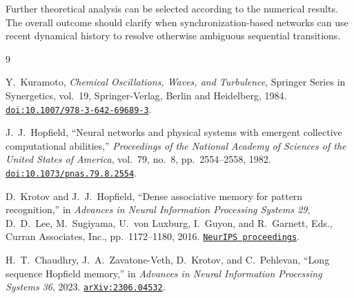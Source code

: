 \documentclass[11pt]{article}
\begin{document}
Further theoretical analysis can be selected according to the numerical results. The overall outcome should clarify when synchronization-based networks can use recent dynamical history to resolve otherwise ambiguous sequential transitions.

\begin{thebibliography}{9}

Y.~Kuramoto,
\textit{Chemical Oscillations, Waves, and Turbulence},
Springer Series in Synergetics, vol.~19,
Springer-Verlag, Berlin and Heidelberg, 1984.
\href{https://doi.org/10.1007/978-3-642-69689-3}
{\texttt{doi:10.1007/978-3-642-69689-3}}.

J.~J.~Hopfield,
``Neural networks and physical systems with emergent collective computational abilities,''
\textit{Proceedings of the National Academy of Sciences of the United States of America},
vol.~79, no.~8, pp.~2554--2558, 1982.
\href{https://doi.org/10.1073/pnas.79.8.2554}
{\texttt{doi:10.1073/pnas.79.8.2554}}.

D.~Krotov and J.~J.~Hopfield,
``Dense associative memory for pattern recognition,''
in \textit{Advances in Neural Information Processing Systems 29},
D.~D.~Lee, M.~Sugiyama, U.~von Luxburg, I.~Guyon, and R.~Garnett, Eds.,
Curran Associates, Inc., pp.~1172--1180, 2016.
\href{https://proceedings.neurips.cc/paper/2016/hash/eaae339c4d89fc102edd9dbdb6a28915-Abstract.html}
{\texttt{NeurIPS proceedings}}.

H.~T.~Chaudhry, J.~A.~Zavatone-Veth, D.~Krotov, and C.~Pehlevan,
``Long sequence Hopfield memory,''
in \textit{Advances in Neural Information Processing Systems 36},
2023.
\href{https://arxiv.org/abs/2306.04532}
{\texttt{arXiv:2306.04532}}.

\end{thebibliography}
\end{document}
